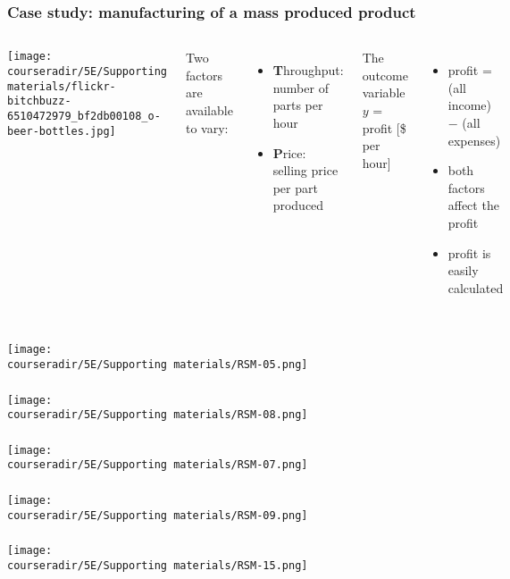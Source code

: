 \documentclass[11pt,aspectratio=169,mathserif]{beamer}
\begin{document}
\begin{frame}\frametitle{Case study: manufacturing of a mass produced product}
	\begin{columns}[c]
				\centerline{\texttt{[image: \\courseradir/5E/Supporting materials/flickr-bitchbuzz-6510472979\_bf2db00108\_o-beer-bottles.jpg]}}
			Two factors are available to vary:
			\begin{itemize}
				\item	\textbf{T}hroughput: number of parts per hour
				\item	\textbf{P}rice: selling price per part produced
			\end{itemize}
			
			\vspace{1cm}
			\pause
			The outcome variable $y$ = profit [\$ per hour]
			
			\begin{itemize}
				\item	profit = (all income) $-$ (all expenses) \pause
				\item	both factors affect the profit
				\item	profit is easily calculated 
			\end{itemize}
	\end{columns}
\end{frame}
\begin{frame}\frametitle{}
	\centerline{\texttt{[image: \\courseradir/5E/Supporting materials/RSM-05.png]}}
\end{frame}
\begin{frame}\frametitle{}
	\centerline{\texttt{[image: \\courseradir/5E/Supporting materials/RSM-08.png]}}
\end{frame}
\begin{frame}\frametitle{}
	\centerline{\texttt{[image: \\courseradir/5E/Supporting materials/RSM-07.png]}}
\end{frame}
\begin{frame}\frametitle{}
	\centerline{\texttt{[image: \\courseradir/5E/Supporting materials/RSM-09.png]}}
\end{frame}
\begin{frame}\frametitle{}
	\centerline{\texttt{[image: \\courseradir/5E/Supporting materials/RSM-15.png]}}
\end{frame}
\end{document}
